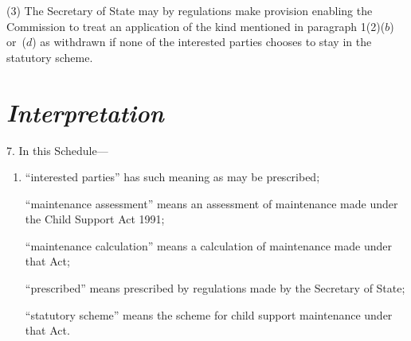 \documentclass[12pt,a4paper]{article}
\begin{document}
(3) The Secretary of State may by regulations make provision enabling the Commission to treat an application of the kind mentioned in paragraph 1(2)($b$) or~($d$) as withdrawn if none of the interested parties chooses to stay in the statutory scheme.


\section*{\itshape Interpretation}

7. In this Schedule—
\begin{enumerate}\item[]
    “interested parties” has such meaning as may be prescribed;

    “maintenance assessment” means an assessment of maintenance made under the Child Support Act 1991;

    “maintenance calculation” means a calculation of maintenance made under that Act;

    “prescribed” means prescribed by regulations made by the Secretary of State;

    “statutory scheme” means the scheme for child support maintenance under that Act. 
\end{enumerate}

\end{document}
